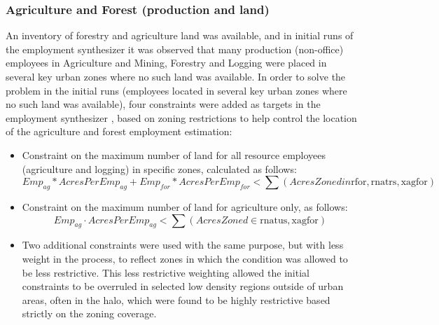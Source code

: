 \subsubsection{Agriculture and Forest (production and land)}
An inventory of forestry and agriculture land was available, and in initial runs of the employment synthesizer it was observed that many production (non-office) employees in Agriculture and Mining, Forestry and Logging were placed in several key urban zones where no such land was available. In order to solve the problem in the initial runs (employees located in several key urban zones where no such land was available), four constraints were added as targets in the employment synthesizer , based on zoning restrictions to help control the location of the agriculture and forest employment estimation:
\begin{itemize}
\item Constraint on the maximum number of land for all resource employees (agriculture and 
logging) in specific zones, calculated as follows:
\begin{equation}\label{eq:6.42}
Emp_{ag} * AcresPerEmp_{ag} + Emp_{for} * AcresPerEmp_{for} < \sum (AcresZoned in \textrm{rfor}, \textrm{rnatrs}, \textrm{xagfor})
\end{equation}
\item Constraint on the maximum number of land for agriculture only, as follows:
\begin{equation}\label{eq:6.43}
Emp_{ag} \cdot AcresPerEmp_{ag} < \sum (AcresZoned \in \textrm{rnatus}, \textrm{xagfor})
\end{equation}

\item Two additional constraints were used with the same purpose, but with less weight in the process, to reflect zones in which the condition was allowed to be less restrictive. This less restrictive weighting allowed the initial constraints to be overruled in selected low density regions outside of urban areas, often in the halo, which were found to be highly restrictive based strictly on the zoning coverage.
\end{itemize}

